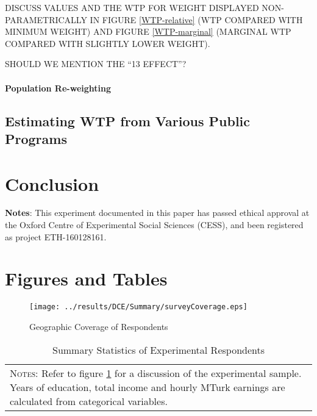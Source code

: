 \documentclass[a4paper, 11pt]{article}
\begin{document}
\begin{spacing}{1.4}
DISCUSS VALUES AND THE WTP FOR WEIGHT DISPLAYED NON-PARAMETRICALLY IN
FIGURE \ref{WTP-relative} (WTP COMPARED WITH MINIMUM WEIGHT) AND FIGURE
\ref{WTP-marginal} (MARGINAL WTP COMPARED WITH SLIGHTLY LOWER WEIGHT).

SHOULD WE MENTION THE ``13 EFFECT''?
\paragraph{Population Re-weighting}

\subsection{Estimating WTP from Various Public Programs}


\section{Conclusion}

\newpage
\noindent\textbf{Notes}: This experiment documented in this paper has passed ethical approval at the Oxford Centre of Experimental Social Sciences (CESS), and been registered as project ETH-160128161.



\clearpage
\section*{Figures and Tables}
\begin{figure}[htpb!]
  \begin{center}
    \caption{Geographic Coverage of Respondents}
    \label{geography}
  \texttt{[image: ../results/DCE/Summary/surveyCoverage.eps]}
  \end{center}
\end{figure}

\begin{table}[htpb!]
  \begin{center}
    \caption{Summary Statistics of Experimental Respondents}
    \label{sumstats}
    \begin{tabular}{lccccc} \toprule
    
    \bottomrule
    \multicolumn{6}{p{11.4cm}}{{\footnotesize\textsc{Notes:} Refer to figure \ref{geography} for a discussion of the experimental sample. Years of education, total income and hourly MTurk earnings are calculated from categorical variables.}}
  \end{tabular} 
  \end{center}
\end{table}


\end{spacing}
\end{document}
